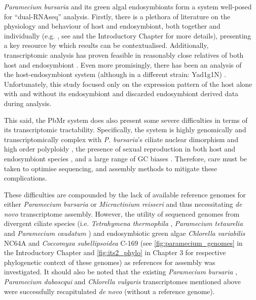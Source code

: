 \textit{Paramecium bursaria} and its green algal endosymbionts form a system well-posed
for ``dual-RNAseq'' analysis.  Firstly, there is a plethora 
of literature on the physiology and behaviour of host and endosymbiont, both together and individually
(e.g. \citep{Iwatsuki1988}, see \citep{Kato2009a} and the Introductory Chapter for more details), presenting 
a key resource by which results can be contextualised.
Additionally, transcriptomic analysis has proven feasible in reasonably close relatives of both host \citep{Arnaiz2010,Kolisko2014} and endosymbiont \citep{Guarnieri2011,Rowe2014,Bashan2015}.  
Even more promisingly, there has been an analysis of the host-endosymbiont
system (although in a different strain: Yad1g1N) \citep{Kodama2014}. 
Unfortunately, this study focused only on the expression pattern of the host
alone with and without its endosymbiont and discarded endosymbiont derived data
during analysis.


This said, the PbMr system does also present some severe difficulties in terms of its transcriptomic tractability.
Specifically, the system is highly genomically and transcriptomically complex with \textit{P. bursaria}'s ciliate nuclear
dimorphism and high order polyploidy \citep{Raikov1995}, 
the presence of sexual reproduction in both host \citep{Jennings1939} and endosymbiont species \citep{Blanc2010},
and a large range of GC biases \citep{Kodama2014}. Therefore, care must be taken to optimise sequencing,
and assembly methods to mitigate these complications.


These difficulties are compounded by the lack of available reference genomes for either \textit{Paramecium bursaria} or \textit{Micractinium reisseri} and thus necessitating \textit{de novo} transcriptome assembly.
However, the utility of sequenced genomes from divergent ciliate species 
(i.e. \textit{Tetrahymena thermophila} \citep{Eisen2006}, \textit{Paramecium tetaurelia} \citep{Aury2006} and \textit{Paramecium caudatum}
\citep{McGrath2014}) and endosymbiotic green algae \textit{Chlorella variabilis} NC64A \citep{Blanc2010} and \textit{Coccomyxa subellipsoidea} C-169 \citep{Blanc2012}
(see \cref{fig:paramecium_genomes} in the Introductory Chapter and \cref{fig:its2_phylo} in Chapter 3 for respective phylogenetic context of these genomes) as references for assembly was investigated.
It should also be noted that the existing \textit{Paramecium bursaria} \citep{Kodama2014}, 
\textit{Paramecium duboscqui} \citep{Kolisko2014} and
\textit{Chlorella vulgaris} \citep{Guarnieri2011} transcriptomes mentioned above were
successfully recapitulated \textit{de novo} (without a reference genome).


